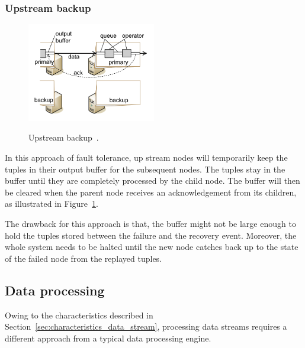 \subsubsection{Upstream backup}

\begin{figure}[!htbp]
    \centering
    \includegraphics[width=0.5\textwidth]{fig/upstream.png}
    \label{fig:upstream}
    \caption{Upstream backup~\cite{upstream_backup}. }
    
\end{figure}


In this approach of fault tolerance, up stream nodes will temporarily 
keep the tuples in their output buffer for the subsequent nodes. The tuples 
stay in the buffer until they are completely processed by the child node. 
The buffer will then be cleared when the parent node receives 
an acknowledgement from its children, as illustrated in Figure~\ref{fig:upstream}. 

The drawback for this approach is that, the buffer might not be large enough to 
hold the tuples stored between the failure and the recovery event. Moreover, 
the whole system needs to be halted until the new node catches back up to 
the state of the failed node from the replayed tuples. 

\subsection{Data processing}

Owing to the characteristics described in Section~\ref{sec:characteristics_data_stream}, 
processing data streams requires a different approach from a typical data processing engine. 




